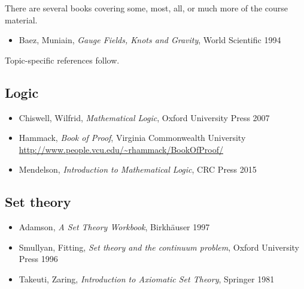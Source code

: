 
There are several books covering some, most, all, or much more of the course material.

\begin{itemize}
\item Baez, Muniain, \textit{Gauge Fields, Knots and Gravity}, World Scientific 1994
\end{itemize}

\noindent Topic-specific references follow.

\subsection*{Logic}

\begin{itemize}
\item Chiswell, Wilfrid, \textit{Mathematical Logic}, Oxford University Press 2007
\item Hammack, \textit{Book of Proof}, Virginia Commonwealth University\\
\url{http://www.people.vcu.edu/~rhammack/BookOfProof/}
\item Mendelson, \textit{Introduction to Mathematical Logic}, CRC Press 2015
\end{itemize}

\subsection*{Set theory}

\begin{itemize}
\item Adamson, \textit{A Set Theory Workbook}, Birkh\"auser 1997
\item Smullyan, Fitting, \textit{Set theory and the continuum problem}, Oxford University Press 1996
\item Takeuti, Zaring, \textit{Introduction to Axiomatic Set Theory}, Springer 1981
\end{itemize}
